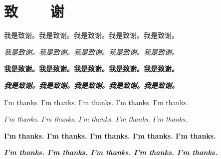 \chapter{致~~~~谢}

我是致谢。我是致谢。我是致谢。我是致谢。我是致谢。

\textit{我是致谢。我是致谢。我是致谢。我是致谢。我是致谢。}

\textbf{我是致谢。我是致谢。我是致谢。我是致谢。我是致谢。}

\textbf{\textit{我是致谢。我是致谢。我是致谢。我是致谢。我是致谢。}}

I'm thanks. I'm thanks. I'm thanks. I'm thanks. I'm thanks.

\textit{I'm thanks. I'm thanks. I'm thanks. I'm thanks. I'm thanks.}

\textbf{I'm thanks. I'm thanks. I'm thanks. I'm thanks. I'm thanks.}

\textbf{\textit{I'm thanks. I'm thanks. I'm thanks. I'm thanks. I'm thanks.}}

\clearpage